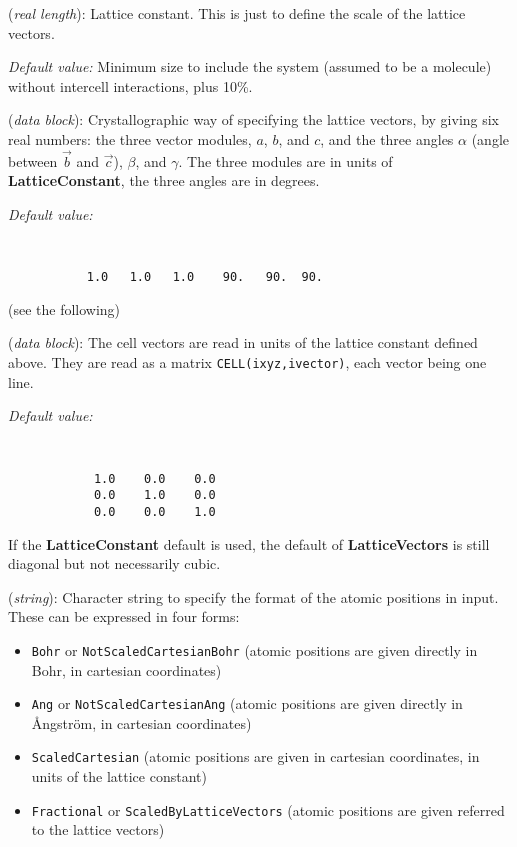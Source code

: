 \documentclass[11pt]{article}
\begin{document}
\begin{description}
\itemsep 10pt
\parsep 0pt


\item[{\bf LatticeConstant}] ({\it real length}): 
Lattice constant. This is just to define the scale of the lattice vectors.

{\it Default value:} Minimum size to include the system (assumed to be a 
molecule) without intercell interactions, plus 10\%. 

\item[{\bf LatticeParameters}] ({\it data block}): 
Crystallographic way of specifying the lattice vectors, by giving
six real numbers: the three vector modules, $a$, $b$, and $c$, and
the three angles $\alpha$ (angle between $\vec b$ and $\vec c$),
$\beta$, and $\gamma$. The three modules are in units of 
{\bf LatticeConstant}, the three angles are in degrees.

{\it Default value:}
{\tt
\begin{verbatim}
           1.0   1.0   1.0    90.   90.  90.
\end{verbatim}
}
\noindent
(see the following)

\item[{\bf LatticeVectors}] ({\it data block}): 
The cell vectors are read in units of the lattice constant defined above. 
They are read as a matrix {\tt CELL(ixyz,ivector)}, each vector being
one line.

{\it Default value:} 
{\tt 
\begin{verbatim}
            1.0    0.0    0.0 
            0.0    1.0    0.0 
            0.0    0.0    1.0 
\end{verbatim}
}
\noindent
If the {\bf LatticeConstant} default is used, the default of 
{\bf LatticeVectors} is still diagonal but not necessarily cubic.

\item[{\bf AtomicCoordinatesFormat}] ({\it string}): 
Character string to specify the format of the atomic positions in
input. These can be expressed in four forms:
\begin{itemize}
\item {\tt Bohr} or {\tt NotScaledCartesianBohr} (atomic positions 
are given directly in Bohr, in cartesian coordinates)
\item {\tt Ang} or {\tt NotScaledCartesianAng} (atomic positions 
are given directly in {\AA}ngstr\"om, in cartesian coordinates)
\item {\tt ScaledCartesian} (atomic positions are given 
in cartesian coordinates, in units of the lattice constant)
\item {\tt Fractional} or {\tt ScaledByLatticeVectors} (atomic positions 
are given referred to the lattice vectors)
\end{itemize}


\end{description}
\end{document}
